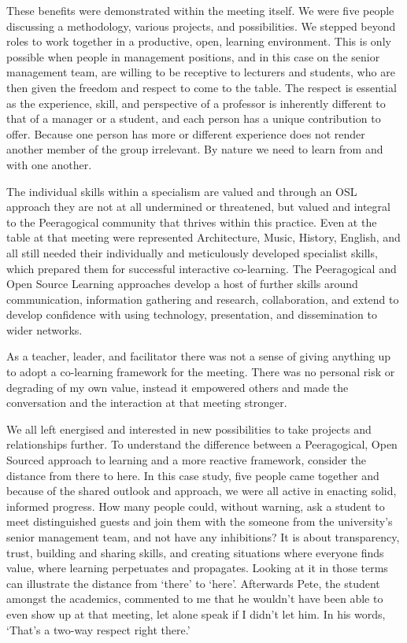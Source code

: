 These benefits were demonstrated within the meeting itself. We were five
people discussing a methodology, various projects, and possibilities. We
stepped beyond roles to work together in a productive, open, learning
environment. This is only possible when people in management positions,
and in this case on the senior management team, are willing to be
receptive to lecturers and students, who are then given the freedom and
respect to come to the table. The respect is essential as the
experience, skill, and perspective of a professor is inherently
different to that of a manager or a student, and each person has a
unique contribution to offer. Because one person has more or different
experience does not render another member of the group irrelevant. By
nature we need to learn from and with one another.

The individual skills within a specialism are valued and through an OSL
approach they are not at all undermined or threatened, but valued and
integral to the Peeragogical community that thrives within this
practice. Even at the table at that meeting were represented
Architecture, Music, History, English, and all still needed their
individually and meticulously developed specialist skills, which
prepared them for successful interactive co-learning. The Peeragogical
and Open Source Learning approaches develop a host of further skills
around communication, information gathering and research, collaboration,
and extend to develop confidence with using technology, presentation,
and dissemination to wider networks.

As a teacher, leader, and facilitator there was not a sense of giving
anything up to adopt a co-learning framework for the meeting. There was
no personal risk or degrading of my own value, instead it empowered
others and made the conversation and the interaction at that meeting
stronger.

We all left energised and interested in new possibilities to take
projects and relationships further. To understand the difference between
a Peeragogical, Open Sourced approach to learning and a more reactive
framework, consider the distance from there to here. In this case study,
five people came together and because of the shared outlook and
approach, we were all active in enacting solid, informed progress. How
many people could, without warning, ask a student to meet distinguished
guests and join them with the someone from the university's senior
management team, and not have any inhibitions? It is about transparency,
trust, building and sharing skills, and creating situations where
everyone finds value, where learning perpetuates and propagates. Looking
at it in those terms can illustrate the distance from `there' to `here'.
Afterwards Pete, the student amongst the academics, commented to me that
he wouldn't have been able to even show up at that meeting, let alone
speak if I didn't let him. In his words, `That's a two-way respect right
there.'
